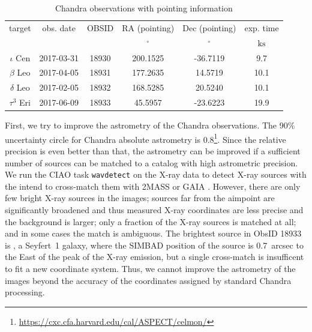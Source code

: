 \documentclass[preprint2]{aastex631}
\begin{document}
\begin{table}
\caption{Chandra observations with pointing information \label{tab:obslog}}
\begin{tabular}{cccccc}
\hline \hline
target & obs. date & OBSID & RA (pointing) & Dec (pointing) & exp. time \\
 &  &  & $\mathrm{{}^{\circ}}$ & $\mathrm{{}^{\circ}}$ & $\mathrm{ks}$ \\
\hline
$\iota$ Cen & 2017-03-31 & 18930 & 200.1525 & -36.7119 & 9.7 \\
$\beta$ Leo & 2017-04-05 & 18931 & 177.2635 & 14.5719 & 10.1 \\
$\delta$ Leo & 2017-02-05 & 18932 & 168.5285 & 20.5240 & 10.1 \\
$\tau^3$ Eri & 2017-06-09 & 18933 & 45.5957 & -23.6223 & 19.9 \\
\hline
\end{tabular}
\end{table}
First, we try to improve the astrometry of the Chandra observations.
The 90\% uncertainty circle for Chandra absolute astrometry is
0.8\arcsec\footnote{\url{https://cxc.cfa.harvard.edu/cal/ASPECT/celmon/}}. Since
the relative precision is even better than that, the astrometry can be
improved if a sufficient number of sources can be matched to a catalog
with high astrometric precision. We run the CIAO task \texttt{wavdetect} on the
X-ray data to detect X-ray sources with the intend to cross-match them
with 2MASS \citep{2006AJ....131.1163S} or GAIA
\citep{2016A&A...595A...1G,2018A&A...616A...1G}. However, there are
only few bright X-ray sources in the images; sources far from the
aimpoint are significantly broadened and thus measured X-ray
coordinates are less precise and the background is larger; only a
fraction of the X-ray sources is matched at all; and in some cases the
match is ambiguous. The brightest source in ObsID 18933 is , a Seyfert~1 galaxy, where the SIMBAD position of
the source is 0.7~arcsec to the East of the peak of the X-ray
emission, but a single cross-match is insufficent to fit a new coordinate system. Thus, we cannot improve the astrometry of the images beyond
the accuracy of the coordinates assigned by standard Chandra
processing.
\end{document}
